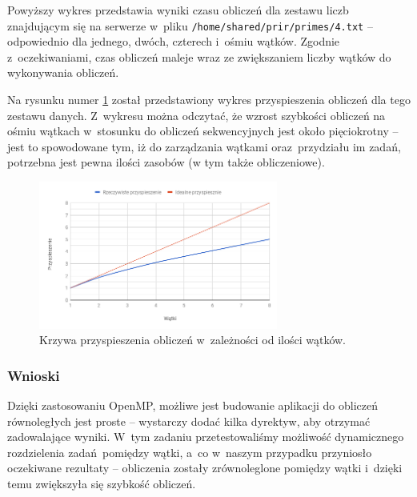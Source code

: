\documentclass[a4paper,12pt]{article}
\begin{document}
Powyższy wykres przedstawia wyniki czasu obliczeń dla zestawu liczb znajdującym się na serwerze w~pliku \texttt{/home/shared/prir/primes/4.txt} -- odpowiednio dla jednego, dwóch, czterech i~ośmiu wątków. Zgodnie z~oczekiwaniami, czas obliczeń maleje wraz ze zwiększaniem liczby wątków do wykonywania obliczeń.

Na rysunku numer \ref{chart-acceleration} został przedstawiony wykres przyspieszenia obliczeń dla tego zestawu danych. Z~wykresu można odczytać, że wzrost szybkości obliczeń na ośmiu wątkach w~stosunku do obliczeń sekwencyjnych jest około pięciokrotny -- jest to spowodowane tym, iż do zarządzania wątkami oraz~przydziału im zadań, potrzebna jest pewna ilości zasobów (w tym także obliczeniowe).

\begin{figure}[!htbp]
  \centering
    \includegraphics[width=0.7\textwidth]{chart2}
    \caption{Krzywa przyspieszenia obliczeń w~zależności od ilości wątków.}
  \label{chart-acceleration}
\end{figure}

\subsubsection*{Wnioski}
Dzięki zastosowaniu OpenMP, możliwe jest budowanie aplikacji do obliczeń równoległych jest proste -- wystarczy dodać kilka dyrektyw, aby otrzymać zadowalające wyniki. W~tym zadaniu przetestowaliśmy możliwość dynamicznego rozdzielenia zadań pomiędzy wątki, a~co w~naszym przypadku przyniosło oczekiwane rezultaty -- obliczenia zostały zrównoleglone pomiędzy wątki i~dzięki temu zwiększyła się szybkość obliczeń.
\end{document}
